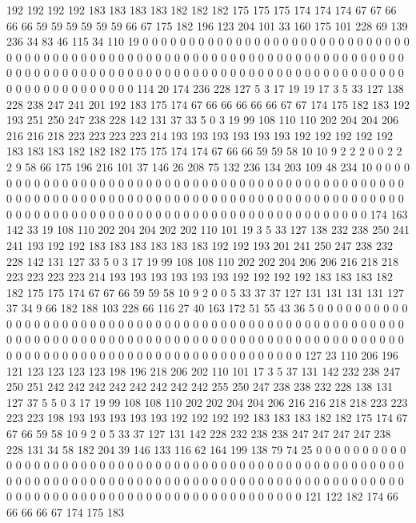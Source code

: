 192 192 192 192 183 183 183 183 182 182 182 175 175 175 174 174 174 67 67 66
66 66 59 59 59 59 59 59 66 67 175 182 196 123 204 101 33 160 175 101
228 69 139 236 34 83 46 115 34 110 19 0 0 0 0 0 0 0 0 0
0 0 0 0 0 0 0 0 0 0 0 0 0 0 0 0 0 0 0 0
0 0 0 0 0 0 0 0 0 0 0 0 0 0 0 0 0 0 0 0
0 0 0 0 0 0 0 0 0 0 0 0 0 0 0 0 0 0 0 0
0 0 0 0 0 0 0 0 0 0 0 0 0 0 0 0 0 0 0 0
0 0 0 0 0 0 0 0 0 0 0 0 0 0 0 0 0 0 0 0
0 0 0 0 0 0 0 0 0 0 0 0 0 0 0 0 0 0 0 0
114 20 174 236 228 127 5 3 17 19 19 17 3 5 33 127 138 228 238 247
241 201 192 183 175 174 67 66 66 66 66 66 67 67 174 175 182 183 192 193
251 250 247 238 228 142 131 37 33 5 0 3 19 99 108 110 110 202 204 204
206 216 216 218 223 223 223 223 214 193 193 193 193 193 193 192 192 192 192 192
183 183 183 182 182 182 175 175 174 174 67 66 66 59 59 58 10 10 9 2
2 2 0 0 2 2 2 9 58 66 175 196 216 101 37 146 26 208 75 132
236 134 203 109 48 234 10 0 0 0 0 0 0 0 0 0 0 0 0 0
0 0 0 0 0 0 0 0 0 0 0 0 0 0 0 0 0 0 0 0
0 0 0 0 0 0 0 0 0 0 0 0 0 0 0 0 0 0 0 0
0 0 0 0 0 0 0 0 0 0 0 0 0 0 0 0 0 0 0 0
0 0 0 0 0 0 0 0 0 0 0 0 0 0 0 0 0 0 0 0
0 0 0 0 0 0 0 0 0 0 0 0 0 0 0 0 0 0 0 0
0 0 0 0 0 0 0 0 0 0 0 0 0 0 0 0 174 163 142 33
19 108 110 202 204 204 202 202 110 101 19 3 5 33 127 138 232 238 250 241
241 193 192 192 183 183 183 183 183 183 192 192 193 201 241 250 247 238 232 228
142 131 127 33 5 0 3 17 19 99 108 108 110 202 202 204 206 206 216 218
218 223 223 223 223 214 193 193 193 193 193 193 192 192 192 192 183 183 183 182
182 175 175 174 67 67 66 59 59 58 10 9 2 0 0 5 33 37 37 127
131 131 131 131 127 37 34 9 66 182 188 103 228 66 116 27 40 163 172 51
55 43 36 5 0 0 0 0 0 0 0 0 0 0 0 0 0 0 0 0
0 0 0 0 0 0 0 0 0 0 0 0 0 0 0 0 0 0 0 0
0 0 0 0 0 0 0 0 0 0 0 0 0 0 0 0 0 0 0 0
0 0 0 0 0 0 0 0 0 0 0 0 0 0 0 0 0 0 0 0
0 0 0 0 0 0 0 0 0 0 0 0 0 0 0 0 0 0 0 0
0 0 0 0 0 0 0 0 0 0 0 0 0 0 0 0 0 0 0 0
0 0 0 0 0 0 0 0 0 0 0 0 127 23 110 206 196 121 123 123
123 123 198 196 218 206 202 110 101 17 3 5 37 131 142 232 238 247 250 251
242 242 242 242 242 242 242 242 255 250 247 238 238 232 228 138 131 127 37 5
5 0 3 17 19 99 108 108 110 202 202 204 204 206 216 216 218 218 223 223
223 223 198 193 193 193 193 193 192 192 192 192 183 183 183 182 182 175 174 67
67 66 59 58 10 9 2 0 5 33 37 127 131 142 228 232 238 238 247 247
247 247 238 228 131 34 58 182 204 39 146 133 116 62 164 199 138 79 74 25
0 0 0 0 0 0 0 0 0 0 0 0 0 0 0 0 0 0 0 0
0 0 0 0 0 0 0 0 0 0 0 0 0 0 0 0 0 0 0 0
0 0 0 0 0 0 0 0 0 0 0 0 0 0 0 0 0 0 0 0
0 0 0 0 0 0 0 0 0 0 0 0 0 0 0 0 0 0 0 0
0 0 0 0 0 0 0 0 0 0 0 0 0 0 0 0 0 0 0 0
0 0 0 0 0 0 0 0 0 0 0 0 0 0 0 0 0 0 0 0
0 0 0 0 0 0 0 0 121 122 182 174 66 66 66 66 67 174 175 183
